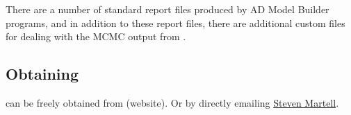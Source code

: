 \begin{multicols}{2}
 There are a number of standard report files produced by AD Model Builder programs, and in addition to these report files, there are additional custom files for dealing with the MCMC output from \iscam. 
 
 \subsection{Obtaining \iscam}
 \iscam can be freely obtained from (website).  Or by directly emailing \href{mailto:s.martell@fisheries.ubc.ca}{Steven Martell}.
 
\end{multicols}
